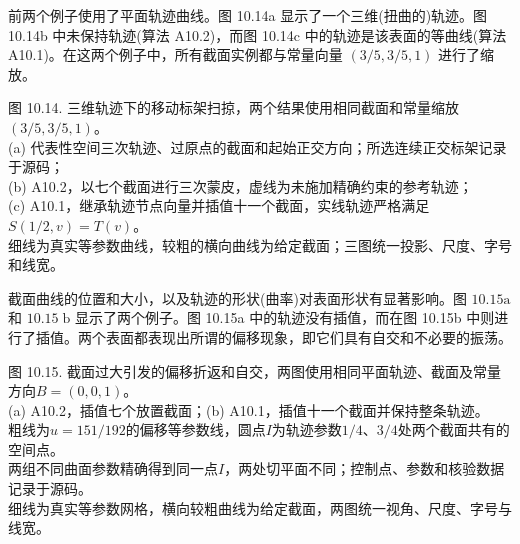\documentclass[../main.tex]{subfiles}
\begin{document}
前两个例子使用了平面轨迹曲线。图 10.14a 显示了一个三维(扭曲的)轨迹。图 10.14b 中未保持轨迹(算法 A10.2)，而图 10.14c 中的轨迹是该表面的等曲线(算法 A10.1)。在这两个例子中，所有截面实例都与常量向量 \(\left( {3/5,3/5,1}\right)\) 进行了缩放。

\begin{center}
\begin{minipage}{37cm}
\vspace*{.6\baselineskip}
\centering
{}\par\vspace{.5cm}
\par\smallskip
图 10.14. 三维轨迹下的移动标架扫掠，两个结果使用相同截面和常量缩放$(3/5,3/5,1)$。\\
(a) 代表性空间三次轨迹、过原点的截面和起始正交方向；所选连续正交标架记录于源码；\\
(b) A10.2，以七个截面进行三次蒙皮，虚线为未施加精确约束的参考轨迹；\\
(c) A10.1，继承轨迹节点向量并插值十一个截面，实线轨迹严格满足$S(1/2,v)=T(v)$。\\
细线为真实等参数曲线，较粗的横向曲线为给定截面；三图统一投影、尺度、字号和线宽。
\end{minipage}
\end{center}

截面曲线的位置和大小，以及轨迹的形状(曲率)对表面形状有显著影响。图 \({10.15}\mathrm{a}\) 和 \({10.15}\mathrm{\;b}\) 显示了两个例子。图 10.15a 中的轨迹没有插值，而在图 10.15b 中则进行了插值。两个表面都表现出所谓的偏移现象，即它们具有自交和不必要的振荡。

\begin{center}
\begin{minipage}{35cm}
\vspace*{.6\baselineskip}
\centering
{}
\par\smallskip
图 10.15. 截面过大引发的偏移折返和自交，两图使用相同平面轨迹、截面及常量方向$B=(0,0,1)$。\\
(a) A10.2，插值七个放置截面；(b) A10.1，插值十一个截面并保持整条轨迹。\\
粗线为$u=151/192$的偏移等参数线，圆点$I$为轨迹参数$1/4$、$3/4$处两个截面共有的空间点。\\
两组不同曲面参数精确得到同一点$I$，两处切平面不同；控制点、参数和核验数据记录于源码。\\
细线为真实等参数网格，横向较粗曲线为给定截面，两图统一视角、尺度、字号与线宽。
\end{minipage}
\end{center}
\end{document}
